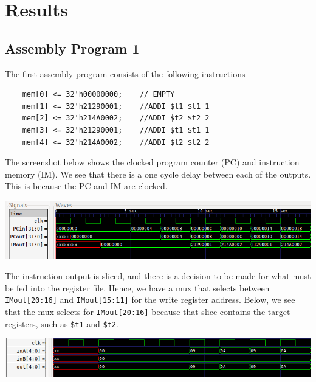\documentclass[twocolumn]{article}
\newcommand{\cc}[1]{\texttt{#1}}
\begin{document}
\section{Results}

\subsection{Assembly Program 1}

The first assembly program consists of the following instructions

\begin{lstlisting}
    mem[0] <= 32'h00000000;    // EMPTY
    mem[1] <= 32'h21290001;    //ADDI $t1 $t1 1
    mem[2] <= 32'h214A0002;    //ADDI $t2 $t2 2
    mem[3] <= 32'h21290001;    //ADDI $t1 $t1 1
    mem[4] <= 32'h214A0002;    //ADDI $t2 $t2 2
\end{lstlisting}

The screenshot below shows the clocked program counter (PC) and instruction memory (IM). We see that there is a one cycle delay between each of the outputs. This is because the PC and IM are clocked.


\begingroup
    \centering
    \medskip
    \includegraphics[width=\columnwidth]{Lab-Tex/Lab4-images/p1_1.png}
    \medskip
\endgroup

The instruction output is sliced, and there is a decision to be made for what must be fed into the register file. Hence, we have a mux that selects between \cc{IMout[20:16]} and \cc{IMout[15:11]} for the write register address. Below, we see that the mux selects for \cc{IMout[20:16]} because that slice contains the target registers, such as \cc{\$t1} and \cc{\$t2}.

\begingroup
    \centering
    \medskip
    \includegraphics[width=\columnwidth]{Lab-Tex/Lab4-images/p1_2.png}
    \medskip
\endgroup
\end{document}
